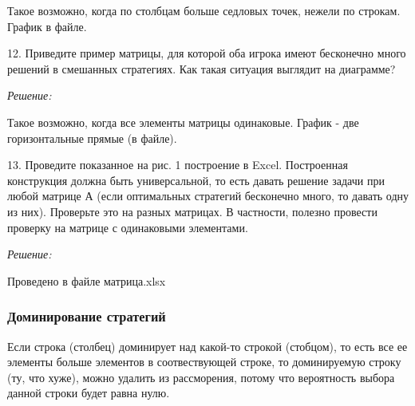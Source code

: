 \documentclass[aps,%
12pt,%
final,%
oneside,
onecolumn,%
musixtex, %
superscriptaddress,%
centertags]{article} %
\begin{document}
Такое возможно, когда по столбцам больше седловых точек, нежели по строкам. График в файле.

12. Приведите пример матрицы, для которой оба игрока имеют бесконечно много решений в смешанных стратегиях. Как такая ситуация выглядит на диаграмме?

\textit{Решение:}

Такое возможно, когда все элементы матрицы одинаковые. График - две горизонтальные прямые (в файле).

13. Проведите показанное на рис. 1 построение в Excel. Построенная конструкция должна быть универсальной, то есть давать решение задачи при любой матрице А (если оптимальных стратегий бесконечно много, то давать одну из них). Проверьте это на разных матрицах. В частности, полезно провести проверку на матрице с одинаковыми элементами.

\textit{Решение:}

Проведено в файле матрица.xlsx

\subsubsection{Доминирование стратегий}

Если строка (столбец) доминирует над какой-то строкой (стобцом), то есть все ее элементы больше элементов в соотвествующей строке, то доминируемую строку (ту, что хуже), можно удалить из рассморения, потому что вероятность выбора данной строки будет равна нулю.
\end{document}
